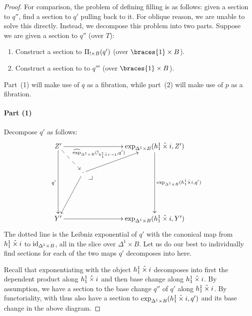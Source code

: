 \documentclass[reqno,10pt,a4paper,oneside]{amsart}
\begin{document}
\begin{proof}
For comparison, the problem of defining filling is as follows: given a section to $q''$, find a section to $q'$ pulling back to it.
For oblique reason, we are unable to solve this directly.
Instead, we decompose this problem into two parts.
Suppose we are given a section to $q''$ (over $T$):
\begin{enumerate}
\item Construct a section to $\Pi_{\mathord{!} \times B}(q')$ (over $\braces{1} \times B$).
\item Construct a section to to $q'''$ (over $\braces{1} \times B$).
\end{enumerate}
Part~(1) will make use of $q$ as a fibration, while part~(2) will make use of $p$ as a fibration.

\paragraph{Part (1)}

Decompose $q'$ as follows:
\[
\xymatrix{
  Z'
  \ar[rrr]
  \ar[ddd]_{q'}
  \ar@{-->}[dr]^{\hatexp_{\Delta^1 \times B}(\canonical_{h_1^1 \hattimes i \to 1}, q')}
&&&
  \ar[ddd]^{\exp_{\Delta^1 \times B}(h_1^1 \hattimes i, q')}
  \exp_{\Delta^1 \times B}(h_1^1 \hattimes i, Z')
\\&
  \arghole
  \ar[ddl]
  \ar[urr]
  \pullback{dr}
\\\\
  Y'
  \ar[rrr]
&&&
  \exp_{\Delta^1 \times B}(h_1^1 \hattimes i, Y')
}
\]
The dotted line is the Leibniz exponential of $q'$ with the canonical map from $h_1^1 \mathbin{\hat{\times}} i$ to $\operatorname{id}_{\Delta^1 \times B}$, all in the slice over $\Delta^1 \times B$.
Let us do our best to individually find sections for each of the two maps $q'$ decomposes into here.

Recall that exponentiating with the object $h_1^1 \mathbin{\hat{\times}} i$ decomposes into first the dependent product along $h_1^1 \mathbin{\hat{\times}} i$ and then base change along $h_1^1 \mathbin{\hat{\times}} i$.
By assumption, we have a section to the base change $q''$ of $q'$ along $h_1^1 \mathbin{\hat{\times}} i$.
By functoriality, with thus also have a section to $\exp_{\Delta^1 \times B}(h_1^1 \mathbin{\hat{\times}} i, q')$ and its base change in the above diagram.


\end{proof}
\end{document}
